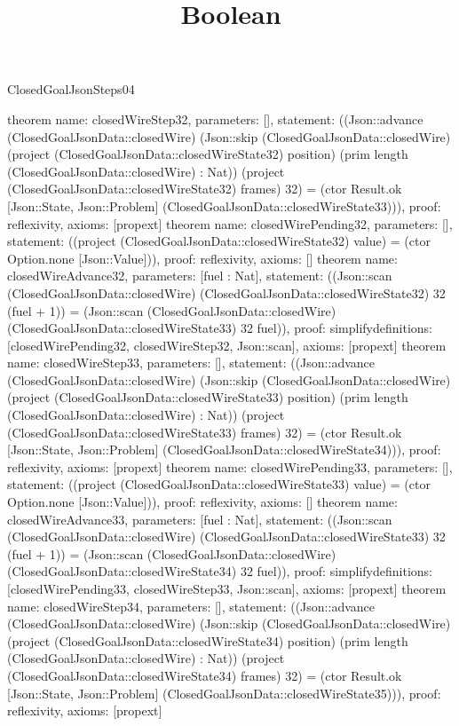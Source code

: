 \begin{lexlean}{ClosedGoalJsonSteps04}
\title{Boolean}
\begin{semanticmodule}
theorem{
 name: closedWireStep32, parameters: [],
 statement: ((Json::advance (ClosedGoalJsonData::closedWire) (Json::skip (ClosedGoalJsonData::closedWire) (project (ClosedGoalJsonData::closedWireState32) position) (prim length (ClosedGoalJsonData::closedWire) : Nat)) (project (ClosedGoalJsonData::closedWireState32) frames) 32) = (ctor Result.ok [Json::State, Json::Problem] (ClosedGoalJsonData::closedWireState33))), proof: reflexivity{}, axioms: [propext]
}
theorem{
 name: closedWirePending32, parameters: [],
 statement: ((project (ClosedGoalJsonData::closedWireState32) value) = (ctor Option.none [Json::Value])), proof: reflexivity{}, axioms: []
}
theorem{
 name: closedWireAdvance32, parameters: [fuel : Nat],
 statement: ((Json::scan (ClosedGoalJsonData::closedWire) (ClosedGoalJsonData::closedWireState32) 32 (fuel + 1)) = (Json::scan (ClosedGoalJsonData::closedWire) (ClosedGoalJsonData::closedWireState33) 32 fuel)), proof: simplify{definitions: [closedWirePending32, closedWireStep32, Json::scan]}, axioms: [propext]
}
theorem{
 name: closedWireStep33, parameters: [],
 statement: ((Json::advance (ClosedGoalJsonData::closedWire) (Json::skip (ClosedGoalJsonData::closedWire) (project (ClosedGoalJsonData::closedWireState33) position) (prim length (ClosedGoalJsonData::closedWire) : Nat)) (project (ClosedGoalJsonData::closedWireState33) frames) 32) = (ctor Result.ok [Json::State, Json::Problem] (ClosedGoalJsonData::closedWireState34))), proof: reflexivity{}, axioms: [propext]
}
theorem{
 name: closedWirePending33, parameters: [],
 statement: ((project (ClosedGoalJsonData::closedWireState33) value) = (ctor Option.none [Json::Value])), proof: reflexivity{}, axioms: []
}
theorem{
 name: closedWireAdvance33, parameters: [fuel : Nat],
 statement: ((Json::scan (ClosedGoalJsonData::closedWire) (ClosedGoalJsonData::closedWireState33) 32 (fuel + 1)) = (Json::scan (ClosedGoalJsonData::closedWire) (ClosedGoalJsonData::closedWireState34) 32 fuel)), proof: simplify{definitions: [closedWirePending33, closedWireStep33, Json::scan]}, axioms: [propext]
}
theorem{
 name: closedWireStep34, parameters: [],
 statement: ((Json::advance (ClosedGoalJsonData::closedWire) (Json::skip (ClosedGoalJsonData::closedWire) (project (ClosedGoalJsonData::closedWireState34) position) (prim length (ClosedGoalJsonData::closedWire) : Nat)) (project (ClosedGoalJsonData::closedWireState34) frames) 32) = (ctor Result.ok [Json::State, Json::Problem] (ClosedGoalJsonData::closedWireState35))), proof: reflexivity{}, axioms: [propext]
}
\end{semanticmodule}
\end{lexlean}
